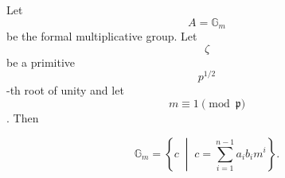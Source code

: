 Let $$A = \mathbb{G}_m$$ be the formal multiplicative group. Let $$\zeta$$ be a primitive $$p^{1/2}$$-th root of unity and let $$m \equiv 1 \pmod{\mathfrak{p}}$$. Then

$$\mathbb{G}_m = \left\{ c \;\middle|\; c = \sum_{i=1}^{n-1} a_i b_i m^i \right\}.$$
